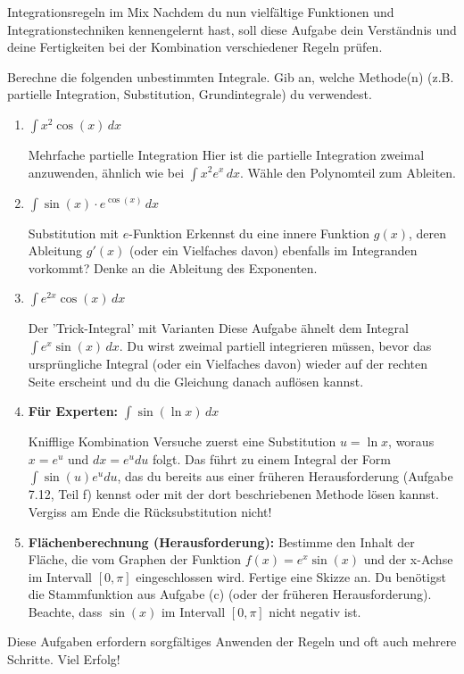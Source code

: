 \begin{aufgabenumgebung}{Integrationsregeln im Mix}
Nachdem du nun vielfältige Funktionen und Integrationstechniken kennengelernt hast, soll diese Aufgabe dein Verständnis und deine Fertigkeiten bei der Kombination verschiedener Regeln prüfen.

Berechne die folgenden unbestimmten Integrale. Gib an, welche Methode(n) (z.B. partielle Integration, Substitution, Grundintegrale) du verwendest.
\begin{enumerate}[label=(\alph*)]
    \item $\int x^2 \cos(x) \,dx$
        \begin{tippumgebung}{Mehrfache partielle Integration}
        Hier ist die partielle Integration zweimal anzuwenden, ähnlich wie bei $\int x^2 e^x \,dx$. Wähle den Polynomteil zum Ableiten.
        \end{tippumgebung}
    \item $\int \sin(x) \cdot e^{\cos(x)} \,dx$
        \begin{tippumgebung}{Substitution mit $e$-Funktion}
        Erkennst du eine innere Funktion $g(x)$, deren Ableitung $g'(x)$ (oder ein Vielfaches davon) ebenfalls im Integranden vorkommt? Denke an die Ableitung des Exponenten.
        \end{tippumgebung}
    \item $\int e^{2x} \cos(x) \,dx$
        \begin{tippumgebung}{Der 'Trick-Integral' mit Varianten}
        Diese Aufgabe ähnelt dem Integral $\int e^x \sin(x) \,dx$. Du wirst zweimal partiell integrieren müssen, bevor das ursprüngliche Integral (oder ein Vielfaches davon) wieder auf der rechten Seite erscheint und du die Gleichung danach auflösen kannst.
        \end{tippumgebung}
    \item \textbf{Für Experten:} $\int \sin(\ln x) \,dx$
        \begin{tippumgebung}{Knifflige Kombination}
        Versuche zuerst eine Substitution $u = \ln x$, woraus $x = e^u$ und $dx = e^u du$ folgt. Das führt zu einem Integral der Form $\int \sin(u) e^u du$, das du bereits aus einer früheren Herausforderung (Aufgabe 7.12, Teil f) kennst oder mit der dort beschriebenen Methode lösen kannst. Vergiss am Ende die Rücksubstitution nicht!
        \end{tippumgebung}
    \item \textbf{Flächenberechnung (Herausforderung):} Bestimme den Inhalt der Fläche, die vom Graphen der Funktion $f(x) = e^x \sin(x)$ und der x-Achse im Intervall $[0, \pi]$ eingeschlossen wird. Fertige eine Skizze an. Du benötigst die Stammfunktion aus Aufgabe (c) (oder der früheren Herausforderung). Beachte, dass $\sin(x)$ im Intervall $[0,\pi]$ nicht negativ ist.
\end{enumerate}
Diese Aufgaben erfordern sorgfältiges Anwenden der Regeln und oft auch mehrere Schritte. Viel Erfolg!
\end{aufgabenumgebung}





